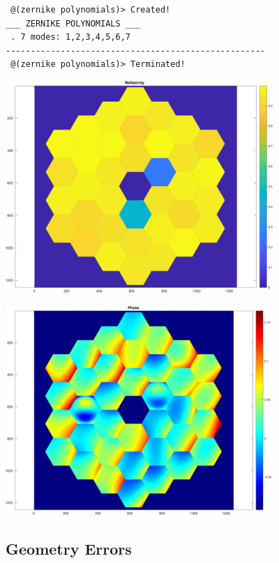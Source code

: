 \documentclass[12pt]{article}
\begin{document}
        \color{lightgray} \begin{verbatim} @(zernike polynomials)> Created!
___ ZERNIKE POLYNOMIALS ___
 . 7 modes: 1,2,3,4,5,6,7
----------------------------------------------------
 @(zernike polynomials)> Terminated!
\end{verbatim} \color{black}
    
\includegraphics [width=4in]{docuPupilClass_09.pdf}

\includegraphics [width=4in]{docuPupilClass_10.pdf}


\subsection*{Geometry Errors}
\end{document}
